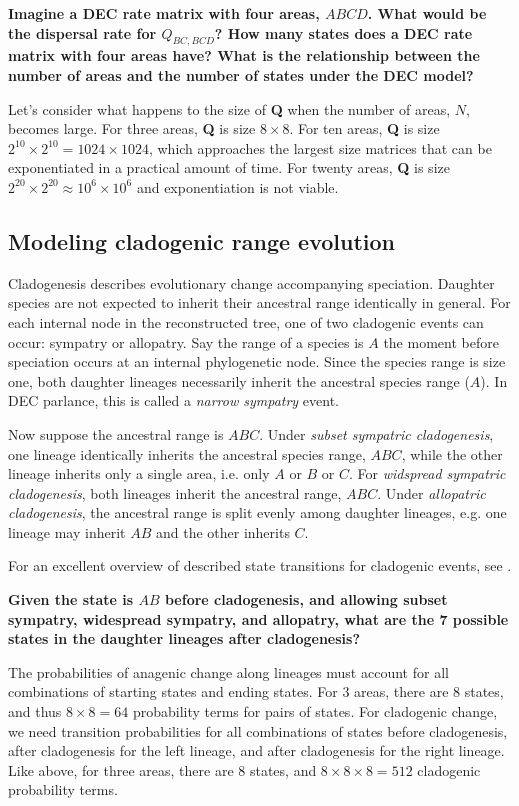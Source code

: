 { \bf {} Imagine a DEC rate matrix with four areas, $ABCD$. What would be the dispersal rate for $Q_{BC,BCD}$? How many states does a DEC rate matrix with four areas have? What is the relationship between the number of areas and the number of states under the DEC model? }

Let's consider what happens to the size of \textbf{Q} when the number of areas, $N$, becomes large.
For three areas, \textbf{Q} is size $8 \times 8$.
For ten areas, \textbf{Q} is size $2^{10} \times 2^{10} = 1024 \times 1024$, which approaches the largest size matrices that can be exponentiated in a practical amount of time.
For twenty areas, \textbf{Q} is size $2^{20} \times 2^{20} \approx 10^6 \times 10^6$ and exponentiation is not viable.


\subsection{Modeling cladogenic range evolution}

Cladogenesis describes evolutionary change accompanying speciation.
Daughter species are not expected to inherit their ancestral range identically in general.
For each internal node in the reconstructed tree, one of two cladogenic events can occur: sympatry or allopatry.
Say the range of a species is $A$ the moment before speciation occurs at an internal phylogenetic node.
Since the species range is size one, both daughter lineages necessarily inherit the ancestral species range ($A$).
In DEC parlance, this is called a {\it narrow sympatry} event.

Now suppose the ancestral range is $ABC$.
Under {\it subset sympatric cladogenesis}, one lineage identically inherits the ancestral species range, $ABC$, while the other lineage inherits only a single area, i.e. only $A$ or $B$ or $C$.
For {\it widspread sympatric cladogenesis}, both lineages inherit the ancestral range, $ABC$.
Under {\it allopatric cladogenesis}, the ancestral range is split evenly among daughter lineages, e.g. one lineage may inherit $AB$ and the other inherits $C$.

For an excellent overview of described state transitions for cladogenic events, see \citet{matzke13}.

{\bf {} Given the state is $AB$ before cladogenesis, and allowing subset sympatry, widespread sympatry, and allopatry, what are the 7 possible states in the daughter lineages after cladogenesis?}

The probabilities of anagenic change along lineages must account for all combinations of starting states and ending states.
For 3 areas, there are 8 states, and thus $8 \times 8 = 64$ probability terms for pairs of states.
For cladogenic change, we need transition probabilities for all combinations of states before cladogenesis, after cladogenesis for the left lineage, and after cladogenesis for the right lineage.
Like above, for three areas, there are 8 states, and $8 \times 8 \times 8 = 512$ cladogenic probability terms.

